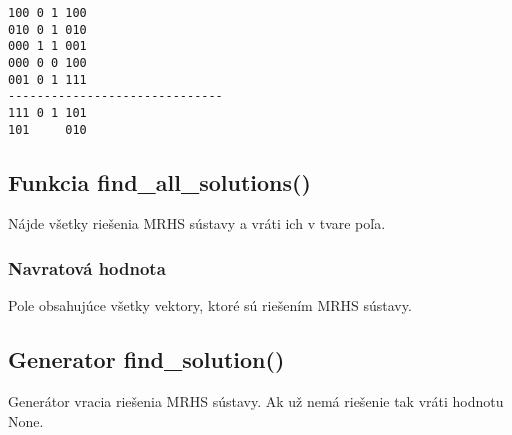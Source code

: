 \begin{lstlisting}[caption={Výpis MRHS}, label={lst:vypis}]
100 0 1 100 
010 0 1 010 
000 1 1 001 
000 0 0 100 
001 0 1 111 
------------------------------
111 0 1 101 
101     010 
\end{lstlisting}

\subsection{Funkcia find\_all\_solutions()}
Nájde všetky riešenia MRHS sústavy a vráti ich v tvare poľa.
\subsubsection{Navratová hodnota}
Pole obsahujúce všetky vektory, ktoré sú riešením MRHS sústavy.

\subsection{Generator find\_solution()}
Generátor vracia riešenia MRHS sústavy. Ak už nemá riešenie tak vráti hodnotu None.

